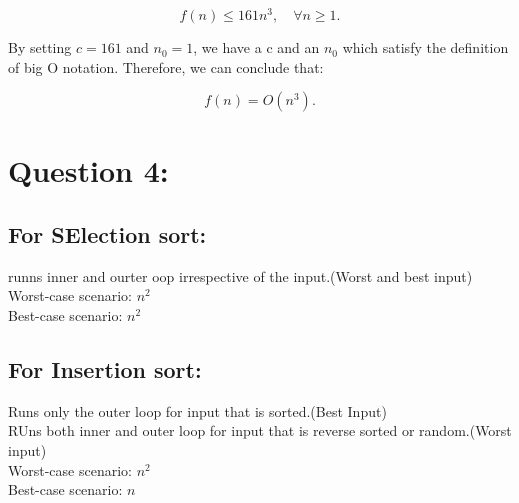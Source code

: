 \documentclass[12pt]{article}
\begin{document}
\[
f(n) \leq 161 n^3, \quad \forall n \geq 1.
\]

By setting \( c = 161 \) and \( n_0 = 1 \), we have a c and an $n_0$ which satisfy the definition of big O notation. Therefore, we can conclude that:

\[
f(n) = O(n^3).
\]
\section{Question 4: }
\subsection*{For SElection sort: }
runns inner and ourter oop irrespective of the input.(Worst and best input)\\
Worst-case scenario: $n^2$\\
Best-case scenario: $n^2$


\subsection*{For Insertion sort: }
Runs only the outer loop for input that is sorted.(Best Input)\\
RUns both inner and outer loop for input that is reverse sorted or random.(Worst input)\\
Worst-case scenario: $n^2$\\
Best-case scenario: $n$
\end{document}
